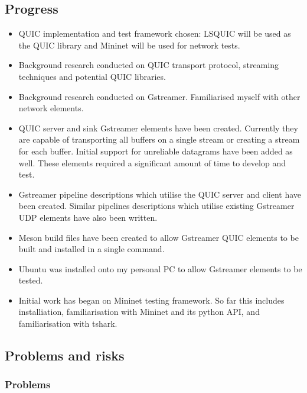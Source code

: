 \documentclass[11pt]{article}
\begin{document}
\subsection{Progress}\label{progress}

\begin{itemize}
\item QUIC implementation and test framework chosen: LSQUIC will be used as the QUIC library and Mininet will be used for network tests.
\item Background research conducted on QUIC transport protocol, streaming techniques and potential QUIC libraries.
\item Background research conducted on Gstreamer. Familiarised myself with other network elements.
\item QUIC server and sink Gstreamer elements have been created. Currently they are capable of transporting
all buffers on a single stream or creating a stream for each buffer. Initial support for unreliable datagrams have been added as well. These elements required a significant amount of time to develop and test.
\item Gstreamer pipeline descriptions which utilise the QUIC server and client have been created. Similar pipelines descriptions which utilise existing Gstreamer UDP elements have also been written.
\item Meson build files have been created to allow Gstreamer QUIC elements to be built and installed in a single command.
\item Ubuntu was installed onto my personal PC to allow Gstreamer elements to be tested.
\item Initial work has began on Mininet testing framework. So far this includes installiation, familiarisation with Mininet and its python API, and familiarisation with tshark.
\end{itemize}

\subsection{Problems and risks}\label{problems-and-risks}

\subsubsection{Problems}\label{problems}
\end{document}

